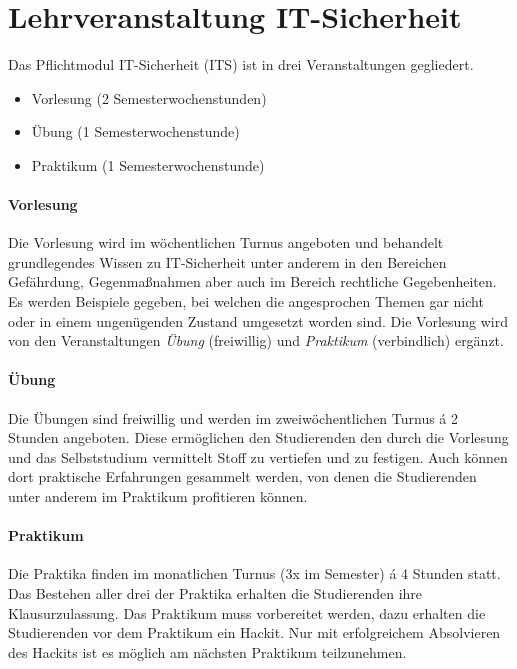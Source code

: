 \section{Lehrveranstaltung IT-Sicherheit} \label{sec:Lehrveranstaltung_IT-Sicherheit}

Das Pflichtmodul IT-Sicherheit (ITS) ist in drei Veranstaltungen gegliedert.\cite[S.30]{hochschuleniederrheinModulhandbuchVollzeitBA2019}
\begin{itemize}
	\item Vorlesung (2 Semesterwochenstunden)
	\item Übung (1 Semesterwochenstunde)
	\item Praktikum (1 Semesterwochenstunde)
\end{itemize}

\paragraph{Vorlesung}\label{para:Vorlesung}
Die Vorlesung wird im wöchentlichen Turnus angeboten und behandelt grundlegendes Wissen zu IT-Sicherheit unter anderem in den Bereichen Gefährdung, Gegenmaßnahmen aber auch im Bereich rechtliche Gegebenheiten. Es werden Beispiele gegeben, bei welchen die angesprochen Themen gar nicht oder in einem ungenügenden Zustand umgesetzt worden sind. Die Vorlesung wird von den Veranstaltungen \textit{Übung} (freiwillig) und \textit{Praktikum} (verbindlich) ergänzt.

\paragraph{Übung}\label{para:Übung}
Die Übungen sind freiwillig und werden im zweiwöchentlichen Turnus á 2 Stunden angeboten. Diese ermöglichen den Studierenden den durch die Vorlesung und das Selbststudium vermittelt Stoff zu vertiefen und zu festigen. Auch können dort praktische Erfahrungen gesammelt werden, von denen die Studierenden unter anderem im Praktikum profitieren können.

\paragraph{Praktikum}\label{para:Praktikum}
Die Praktika finden im monatlichen Turnus (3x im Semester) á 4 Stunden statt. Das Bestehen aller drei der Praktika erhalten die Studierenden ihre Klausurzulassung. Das Praktikum muss vorbereitet werden, dazu erhalten die Studierenden vor dem Praktikum ein Hackit. Nur mit erfolgreichem Absolvieren des Hackits ist es möglich am nächsten Praktikum teilzunehmen.\cite{quadePraktikumITSecurity2017}